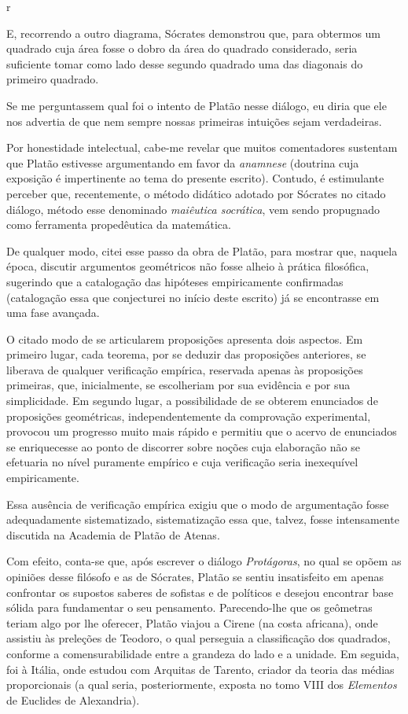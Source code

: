 r\documentclass{hipatia}
\begin{document}
E, recorrendo a outro diagrama, Sócrates demonstrou que, para obtermos um quadrado cuja área fosse o dobro da área do quadrado considerado, seria suficiente tomar como lado desse segundo quadrado uma das diagonais do primeiro quadrado.

Se me perguntassem qual foi o intento de Platão nesse diálogo, eu diria que ele nos advertia de que nem sempre nossas primeiras intuições sejam verdadeiras. 

Por honestidade intelectual, cabe-me revelar que muitos comentadores sustentam que Platão estivesse argumentando em favor da \emph{anamnese}  (doutrina cuja exposição é impertinente ao tema do presente escrito). Contudo, é estimulante perceber que, recentemente, o método didático adotado por Sócrates no citado diálogo, método esse denominado \emph{maiêutica socrática}, vem sendo propugnado como ferramenta propedêutica da matemática. \cite[p. 8]{winter1989}

De qualquer modo, citei esse passo da obra de Platão, para mostrar que, naquela época, discutir argumentos geométricos não fosse alheio à prática filosófica, sugerindo que a catalogação das hipóteses empiricamente confirmadas  (catalogação essa que conjecturei no início deste escrito)  já se encontrasse em uma fase avançada.

O citado modo de se articularem proposições apresenta dois aspectos. Em primeiro lugar, cada teorema, por se deduzir das proposições anteriores, se liberava de qualquer verificação empírica, reservada apenas às proposições primeiras, que, inicialmente, se escolheriam por sua evidência e por sua simplicidade. Em segundo lugar, a possibilidade de se obterem enunciados de proposições geométricas, independentemente da comprovação experimental, provocou um progresso muito mais rápido e permitiu que o acervo de enunciados se enriquecesse ao ponto de discorrer sobre noções cuja elaboração não se efetuaria no nível puramente empírico e cuja verificação seria inexequível empiricamente.  \cite[p. 120]{kagan1986}\cite[p. 12]{smogorzhevski1976}  

Essa ausência de verificação empírica exigiu que o modo de argumentação fosse adequadamente sistematizado, sistematização essa que, talvez, fosse intensamente discutida na Academia de Platão de Atenas.

Com efeito, conta-se que, após escrever o diálogo \emph{Protágoras}, no qual se opõem as opiniões desse filósofo e as de Sócrates, Platão se sentiu insatisfeito em apenas confrontar os supostos saberes de sofistas e de políticos e desejou encontrar base sólida para fundamentar o seu pensamento. Parecendo-lhe que os geômetras teriam algo por lhe oferecer, Platão viajou a Cirene (na costa africana), onde assistiu às preleções de Teodoro, o qual perseguia a classificação dos quadrados, conforme a comensurabilidade entre a grandeza do lado e a unidade. Em seguida, foi à Itália, onde estudou com Arquitas de Tarento, criador da teoria das médias proporcionais (a qual seria, posteriormente, exposta no tomo VIII dos \emph{Elementos} de Euclides de Alexandria).  \cite[p. 103]{laercio1988}\cite[p. 170, 182]{mosterin1984}\cite[p. 209]{russell1945} 
\end{document}

